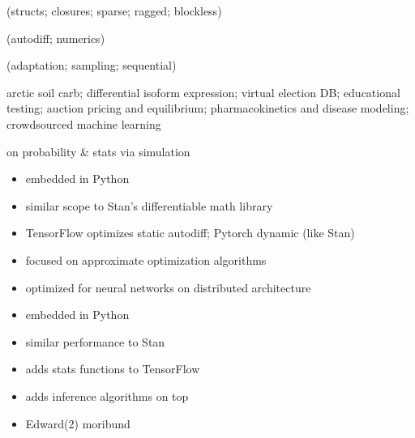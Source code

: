 \documentclass[10pt]{report}
\begin{document}
\begin{subitemize}
\item {} (structs; closures; sparse; ragged; blockless)
\item {} (autodiff; numerics)
\item {} (adaptation; sampling; sequential)
\item {}
\begin{subitemize}
\item arctic soil carb; differential isoform expression; virtual election DB;
educational testing; auction pricing and equilibrium; pharmacokinetics and
disease modeling; crowdsourced machine learning
\end{subitemize}
\item {} on probability \& stats via simulation
\end{subitemize}




\begin{itemize}
\item embedded in Python
\item similar scope to Stan's differentiable math library
\item TensorFlow optimizes static autodiff; Pytorch dynamic (like Stan)
\item focused on approximate optimization algorithms
\item optimized for neural networks on distributed architecture
\end{itemize}

\begin{itemize}
\item embedded in Python
\item similar performance to Stan
\item adds stats functions to TensorFlow
\item adds inference algorithms on top
\item Edward(2) moribund
\end{itemize}
\end{document}

